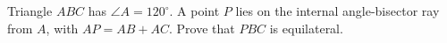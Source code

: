 Triangle $ABC$ has $\angle A=120^\circ$. A point $P$ lies on the internal angle-bisector ray from $A$, with $AP=AB+AC$. Prove that $PBC$ is equilateral.

